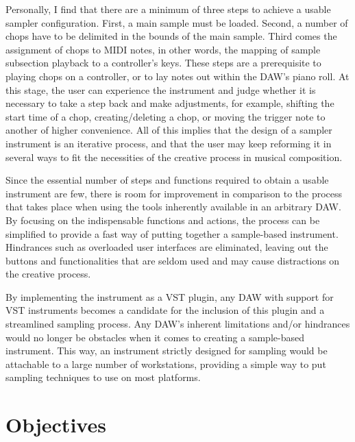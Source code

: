 \documentclass[12pt, a4paper, hidelinks]{report}
\begin{document}
	Personally, I find that there are a minimum of three steps to achieve a usable sampler configuration. First, a main sample must be loaded. Second, a number of chops have to be delimited in the bounds of the main sample. Third comes the assignment of chops to MIDI notes, in other words, the mapping of sample subsection playback to a controller's keys. These steps are a prerequisite to playing chops on a controller, or to lay notes out within the DAW's piano roll. At this stage, the user can experience the instrument and judge whether it is necessary to take a step back and make adjustments, for example, shifting the start time of a chop, creating/deleting a chop, or moving the trigger note to another of higher convenience. All of this implies that the design of a sampler instrument is an iterative process, and that the user may keep reforming it in several ways to fit the necessities of the creative process in musical composition. \par 
	
	Since the essential number of steps and functions required to obtain a usable instrument are few, there is room for improvement in comparison to the process that takes place when using the tools inherently available in an arbitrary DAW. By focusing on the indispensable functions and actions, the process can be simplified to provide a fast way of putting together a sample-based instrument. Hindrances such as overloaded user interfaces are eliminated, leaving out the buttons and functionalities that are seldom used and may cause distractions on the creative process. \par
	
	By implementing the instrument as a VST plugin, any DAW with support for VST instruments becomes a candidate for the inclusion of this plugin and a streamlined sampling process. Any DAW's inherent limitations and/or hindrances would no longer be obstacles when it comes to creating a sample-based instrument. This way, an instrument strictly designed for sampling would be attachable to a large number of workstations, providing a simple way to put sampling techniques to use on most platforms.
	
	
	\section{Objectives}
	
\end{document}
